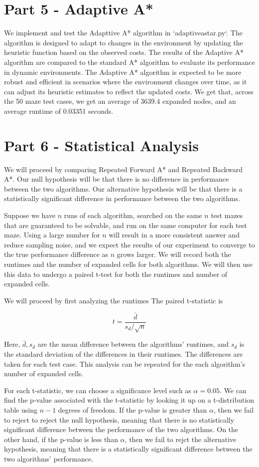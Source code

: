 \documentclass[12pt]{article}
\begin{document}
\section{Part 5 - Adaptive A*}

We implement and test the Adapttive A* algorithm in `adaptiveastar.py`.
The algorithm is designed to adapt to changes in the environment by updating the heuristic function based on the observed costs.
The results of the Adaptive A* algorithm are compared to the standard A* algorithm to evaluate its performance in dynamic environments.
The Adaptive A* algorithm is expected to be more robust and efficient in scenarios where the environment changes over time, as it can adjust its heuristic estimates to reflect the updated costs.
We get that,
across the 50 maze test cases,
we get an average of 3639.4 expanded nodes,
and an average runtime of 0.03351 seconds.


\section{Part 6 - Statistical Analysis}

We will proceed by comparing Repeated Forward A* and Repeated Backward A*.
Our null hypothesis will be that there is no difference in performance between the two algorithms.
Our alternative hypothesis will be that there is a statistically significant difference in performance between the two algorithms.

Suppose we have $n$ runs of each algorithm,
searched on the same $n$ test mazes that are guaranteed to be solvable,
and run on the same computer for each test maze.
Using a large number for $n$ will result in a more consistent answer and reduce sampling noise,
and we expect the results of our experiment to converge to the true performance difference as $n$ grows larger.
We will record both the runtimes and the number of expanded cells for both algorithms.
We will then use this data to undergo a paired t-test for both the runtimes and number of expanded cells.

We will proceed by first analyzing the runtimes
The paired t-statistic is

$$
t = \frac{\bar{d}}{s_d/\sqrt{n}}
$$

Here, 
$\bar{d}, s_d$ are the mean difference between the algorithms' runtimes, 
and $s_d$ is the standard deviation of the differences in their runtimes.
The differences are taken for each test case.
This analysis can be repeated for the each algorithm's number of expanded cells.

For each t-statistic,
we can choose a significance level such as 
$\alpha = 0.05$.
We can find the p-value associated with the t-statistic by looking it up on a t-distribution table using 
$n-1$ degrees of freedom.
If the p-value is greater than $\alpha$,
then we fail to reject to reject the null hypothesis,
meaning that there is no statistically significant difference between the performance of the two algorithms.
On the other hand,
if the p-value is less than $\alpha$,
then we fail to rejct the alternative hypothesis,
meaning that there is a statistically significant difference between the two algorithms' performance.
\end{document}

